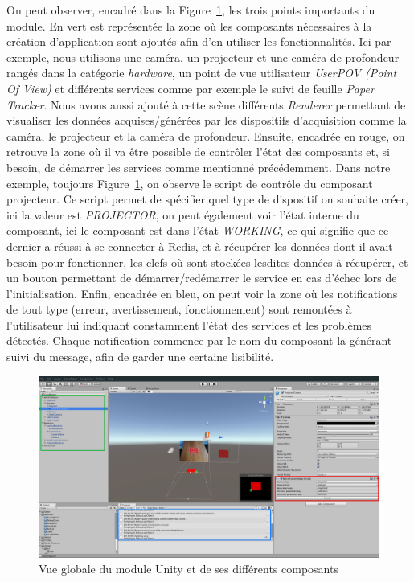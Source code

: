 On peut observer, encadré dans la Figure~\ref{fig:unity:plugin}, les trois points importants du module. 
En vert est représentée la zone où les composants nécessaires à la création d'application sont ajoutés afin d'en utiliser les fonctionnalités. Ici par exemple, nous utilisons une caméra, un projecteur et une caméra de profondeur rangés dans la catégorie \emph{hardware}, un point de vue utilisateur \emph{UserPOV (Point Of View)} et différents services comme par exemple le suivi de feuille \emph{Paper Tracker}. Nous avons aussi ajouté à cette scène différents \emph{Renderer} permettant de visualiser les données acquises/générées par les dispositifs d'acquisition comme la caméra, le projecteur et la caméra de profondeur.
Ensuite, encadrée en rouge, on retrouve la zone où il va être possible de contrôler l'état des composants et, si besoin, de démarrer les services comme mentionné précédemment. Dans notre exemple, toujours Figure~\ref{fig:unity:plugin}, on observe le script de contrôle du composant projecteur. Ce script permet de spécifier quel type de dispositif on souhaite créer, ici la valeur est \emph{PROJECTOR}, on peut également voir l'état interne du composant, ici le composant est dans l'état \emph{WORKING}, ce qui signifie que ce dernier a réussi à se connecter à Redis, et à récupérer les données dont il avait besoin pour fonctionner, les clefs où sont stockées lesdites données à récupérer, et un bouton permettant de démarrer/redémarrer le service en cas d'échec lors de l'initialisation.
Enfin, encadrée en bleu, on peut voir la zone où les notifications de tout type (erreur, avertissement, fonctionnement) sont remontées à l'utilisateur lui indiquant constamment l'état des services et les problèmes détectés. Chaque notification commence par le nom du composant la générant suivi du message, afin de garder une certaine lisibilité.

\begin{figure}[H]
\centering
\includegraphics[width=\linewidth]{images/unity-plugin}
\caption{Vue globale du module Unity et de ses différents composants}
\label{fig:unity:plugin}
\end{figure}

